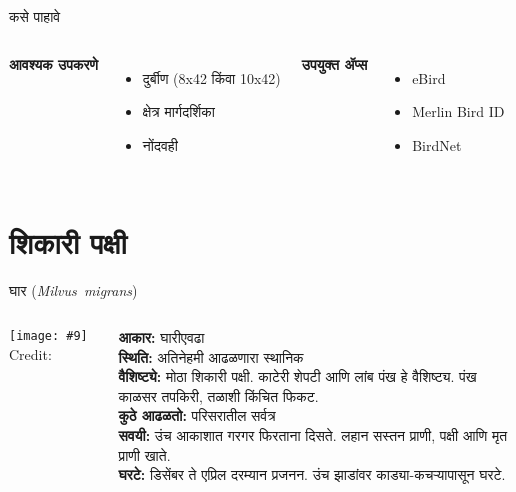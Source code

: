 \documentclass[aspectratio=169]{beamer}
\newcommand{\imagecredit}[1]{%
  \def\stripext##1.jpg{##1}%
  \edef\creditfile{\stripext#1_credit.txt}%
  {\scriptsize\latintext Credit: }%
}
\newcommand{\sciname}[1]{\mbox{\latintext\textit{#1}}}
\begin{document}
\begin{frame}{कसे पाहावे}
    \begin{columns}[T]
        \textbf{आवश्यक उपकरणे}
        \begin{itemize}
            \item दुर्बीण ({\latintext 8x42} किंवा {\latintext 10x42})
            \item क्षेत्र मार्गदर्शिका
            \item नोंदवही
        \end{itemize}
        \textbf{उपयुक्त ॲप्स}
        \begin{itemize}
            \item {\latintext eBird}
            \item {\latintext Merlin Bird ID}
            \item {\latintext BirdNet}
        \end{itemize}
    \end{columns}
\end{frame}

\newcommand{\birdslide}[9]{%
\begin{frame}{#1 (\sciname{#2})}
    \begin{columns}[T]
        \column{0.5\textwidth}
        \texttt{[image: \#9]}
        \imagecredit{#9}
        \column{0.5\textwidth}
        \textbf{आकार:} #3 \\
        \textbf{स्थिति:} #4 \\[0.5em]
        \textbf{वैशिष्ट्ये:} #5 \\[0.5em]
        \textbf{कुठे आढळतो:} #6 \\[0.5em]
        \textbf{सवयी:} #7 \\[0.5em]
        \textbf{घरटे:} #8
    \end{columns}
\end{frame}
}

\section{शिकारी पक्षी}
\birdslide{घार}{Milvus migrans}
{घारीएवढा}
{अतिनेहमी आढळणारा स्थानिक}
{मोठा शिकारी पक्षी. काटेरी शेपटी आणि लांब पंख हे वैशिष्ट्य. पंख काळसर तपकिरी, तळाशी किंचित फिकट.}
{परिसरातील सर्वत्र}
{उंच आकाशात गरगर फिरताना दिसते. लहान सस्तन प्राणी, पक्षी आणि मृत प्राणी खाते.}
{डिसेंबर ते एप्रिल दरम्यान प्रजनन. उंच झाडांवर काड्या-कचऱ्यापासून घरटे.}
{black-kite.jpg}
\end{document}
